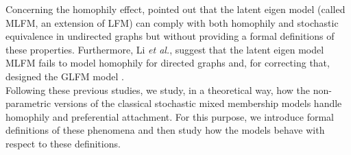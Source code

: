 Concerning the homophily effect, \cite{hoff2008modeling} pointed out that the latent eigen model (called MLFM, an extension of LFM) can comply with both homophily and stochastic equivalence in undirected graphs but without providing a formal definitions of these properties. Furthermore, Li \textit{et al.}, suggest that the latent eigen model  MLFM fails to model homophily  for directed graphs and, for correcting that, designed the GLFM model \cite{Li11}.~\\

Following these previous studies, we study, in a theoretical way, how the non-parametric versions of the classical stochastic mixed membership models handle homophily and preferential attachment. For this purpose, we introduce formal definitions of these phenomena and then study how the models behave with respect  to these definitions.
